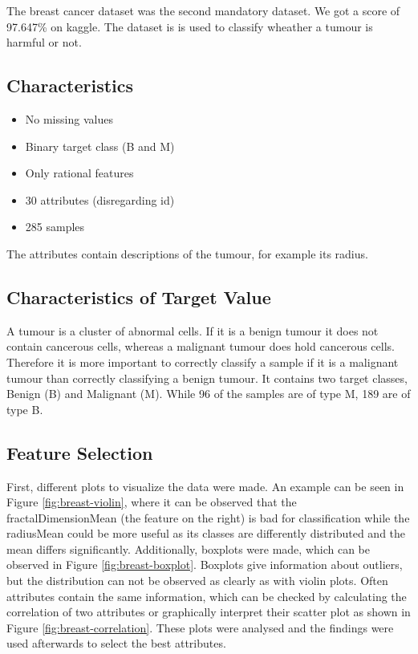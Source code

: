 The breast cancer dataset was the second mandatory dataset.
We got a score of 97.647\% on kaggle. 
The dataset is is used to classify wheather a tumour is harmful or not.

\subsection{Characteristics}

\begin{itemize}
\item No missing values
\item Binary target class (B and M)
\item Only rational features
\item 30 attributes (disregarding id)
\item 285 samples
\end{itemize}

The attributes contain descriptions of the tumour, for example its radius.

\subsection{Characteristics of Target Value}

A tumour is a cluster of abnormal cells.
If it is a benign tumour it does not contain cancerous cells, whereas a malignant tumour does hold cancerous cells.
Therefore it is more important to correctly classify a sample if it is a malignant tumour than correctly classifying a benign tumour.
It contains two target classes, Benign (B) and Malignant (M).
While 96 of the samples are of type M, 189 are of type B.



\subsection{Feature Selection}
First, different plots to visualize the data were made.
An example can be seen in Figure \ref{fig:breast-violin}, where it can be observed that the fractalDimensionMean (the feature on the right) is bad for classification while the radiusMean could be more useful as its classes are differently distributed and the mean differs significantly.
Additionally, boxplots were made, which can be observed in Figure \ref{fig:breast-boxplot}.
Boxplots give information about outliers, but the distribution can not be observed as clearly as with violin plots.
Often attributes contain the same information, which can be checked by calculating the correlation of two attributes or graphically interpret their scatter plot as shown in Figure \ref{fig:breast-correlation}.
These plots were analysed and the findings were used afterwards to select the best attributes.

